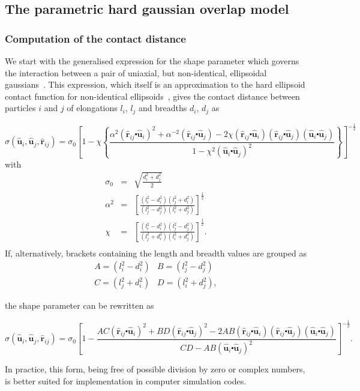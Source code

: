 \documentclass[%
reprint,
superscriptaddress,
showpacs,
 amsmath,amssymb,
 aps,
floatfix,
]{revtex4-1}
\newcommand{\vecth}[1]{ \mathbf{\hat{#1} } }
\newcommand{\rij}{\vecth{r}_{ij}}
\newcommand{\ui}{\vecth{u}_i}
\newcommand{\uj}{\vecth{u}_j}
\newcommand{\sijr}{\sigma(\ui,\uj,\rij)}
\newcommand{\dotProdP}[2]{ \left( #1 \centerdot #2 \right) }
\newcommand{\half}{\frac{1}{2}}
\begin{document}
\subsection{The parametric hard gaussian overlap model} \label{s:GBP_method}

\subsubsection{Computation of the contact distance}

We start with the generalised expression for the shape parameter which governs the interaction
between a pair of uniaxial, but non-identical, ellipsoidal gaussians~\cite{CleaverCare96}. This
expression, which itself is an approximation to the hard ellipsoid contact function for
non-identical ellipsoids~\cite{Rasmussen}, gives the contact distance between particles $i$ and
$j$ of elongations $l_i$, $l_j$ and breadths $d_i$, $d_j$ as
\begin{widetext}
\begin{equation}
\sijr = \sigma_0 \left[ 1 - \chi\left\{
    \frac{\alpha^2\dotProdP{\rij}{\ui}^2 + \alpha^{-2}\dotProdP{\rij}{\uj}
    -2\chi\dotProdP{\rij}{\ui}\dotProdP{\rij}{\uj}\dotProdP{\ui}{\uj}  }{1-\chi^2\dotProdP{\ui}{\uj}^2}
    \right\}\right]^{-\frac{1}{2}}
\end{equation}
with
\begin{eqnarray*}
    \sigma_0 &=& \sqrt{\frac{d^2_i + d^2_j}{2}}               \\
    \alpha^2 &=& \left[ \frac{ (l^2_i-d^2_i)(l^2_j+d^2_i)}
    {(l^2_j-d^2_j)(l^2_i+d^2_j)}\right]^{\half}         \\
    \chi &=& \left[ \frac{(l^2_i-d^2_i)(l^2_j-d^2_j)}
    {(l^2_j+d^2_i)(l^2_i+d^2_j)}\right]^{\half}.         \\
\end{eqnarray*}
If, alternatively, brackets containing the length and breadth values are grouped as
\begin{equation*}
    \begin{array}{cc}
    A = (l^2_i-d^2_i) &B = (l^2_j-d^2_j) \\
    C = (l^2_j+d^2_i) &D = (l^2_i+d^2_j),
    \end{array}
\end{equation*}

the shape parameter can be rewritten as

\begin{equation}
\label{eqn:GGB}
    \sijr = \sigma_0 \left[ 1 - \frac{ AC\dotProdP{\rij}{\ui}^2 + BD\dotProdP{\rij}{\uj}^2
    - 2AB\dotProdP{\rij}{\ui}\dotProdP{\rij}{\uj}\dotProdP{\ui}{\uj} }
    {CD - AB\dotProdP{\ui}{\uj}^2}
    \right]^{-\half}.
\end{equation}
\end{widetext}
In practice, this form, being free of possible division by zero or complex numbers, is better
suited for implementation in computer simulation codes.
\end{document}
